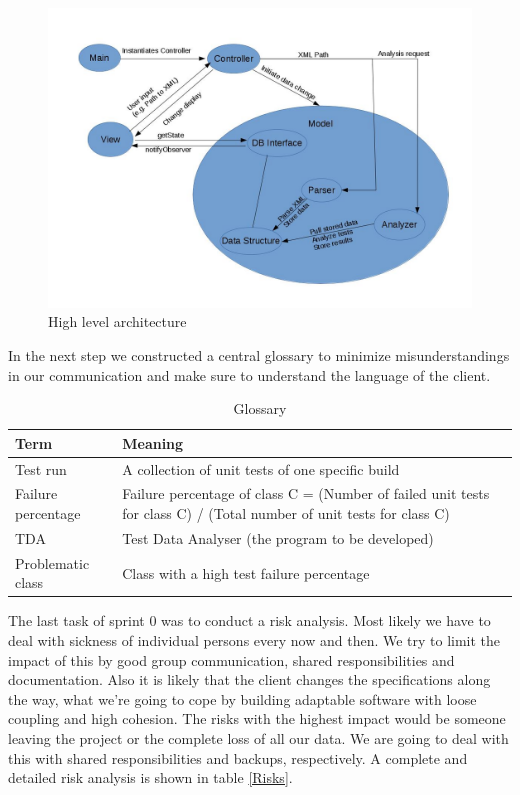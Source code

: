 \begin{figure}[h]
\begin{center}
\includegraphics[scale=0.3]{pics/Architecture_diagram.jpg}
\caption{High level architecture} 
\label{HLA}
\end{center}
\end{figure}

In the next step we constructed a central glossary to minimize misunderstandings in our communication and make sure to understand the language of the client. \\ 

\begin{table}[h]
  \caption{Glossary}
  \label{Glossary}
  \centering
  \begin{tabular}{p{2.3cm}||p{10cm}|}
  	Term & Meaning \\ 
  	\hline
  	\hline
  	Test run & A collection of unit tests of one specific build \\ 
  	\hline
  	Failure percentage & Failure percentage of class C = (Number of failed unit tests for class C) / (Total number of unit tests for class C) \\ 
  	\hline
  	TDA & Test Data Analyser (the program to be developed) \\ 
  	\hline
  	Problematic class & Class with a high test failure percentage \\ 
  	\hline
  \end{tabular}
\end{table}

The last task of sprint 0 was to conduct a risk analysis. Most likely we have to deal with sickness of individual persons every now and then. We try to limit the impact of this by good group communication, shared responsibilities and documentation. Also it is likely that the client changes the specifications along the way, what we’re going to cope by building adaptable software with loose coupling and high cohesion. The risks with the highest impact would be someone leaving the project or the complete loss of all our data. We are going to deal with this with shared responsibilities and backups, respectively. A complete and detailed risk analysis is shown in table \ref{Risks}. \\ 

